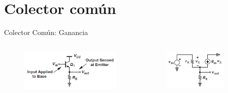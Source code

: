 \documentclass[t,aspectratio=169]{beamer}
\begin{document}
\section{Colector común}
\begin{frame}{Colector Común: Ganancia}

\vspace{-5mm}\begin{columns}
\begin{column}{0.5\textwidth}

\begin{figure}[H]
    \centering
    \includegraphics[width=\textwidth]{figuras/colector_comun_circuito.png}
\end{figure}

\end{column}
\begin{column}{0.5\textwidth}

\begin{figure}[H]
    \centering
    \includegraphics[width=0.8\textwidth]{figuras/colector_comun_ganancia.png}
\end{figure}

\end{column}
\end{columns}
    
\end{frame}
\end{document}
